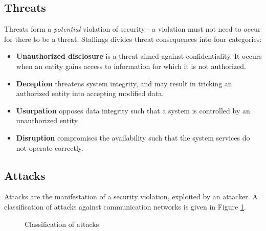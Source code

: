 \subsection{Threats}
Threats form a \textit{potential} violation of security - a violation must not need to occur for there to be a threat. Stallings \cite{stallingsThreat}
divides threat consequences into four categories:
\begin{itemize}
 \item \textbf{Unauthorized disclosure} is a threat aimed against confidentiality. It occurs when an entity gains access to information for which it is not authorized.
 \item \textbf{Deception} threatens system integrity, and may result in tricking an authorized entity into accepting modified data.
 \item \textbf{Usurpation} opposes data integrity such that a system is controlled by an unauthorized entity.
  \item \textbf{Disruption} compromises the availability such that the system services do not operate correctly.
\end{itemize}

\subsection{Attacks}\label{sec:attacks}
Attacks are the manifestation of a security violation, exploited by an attacker. 
A classification of attacks against communication networks is given in Figure \ref{fig:attacks}.  

\begin{figure}[h]
    \centering
{}
\caption{Classification of attacks}
    \label{fig:attacks}
\end{figure}

